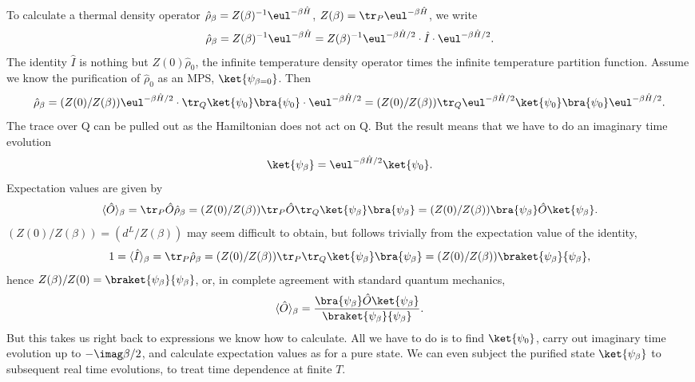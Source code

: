 To calculate a thermal density operator $\hat{\rho}_\beta= Z(\beta)^{-1} \eul^{-\beta \hat{H}}$, $Z(\beta) = \tr_P \eul^{-\beta \hat{H}}$, we write
\begin{equation}
\hat{\rho}_\beta = Z(\beta)^{-1} \eul^{-\beta \hat{H}} = Z(\beta)^{-1} \eul^{-\beta \hat{H}/2} \cdot \hat{I} \cdot \eul^{-\beta \hat{H}/2} .
\end{equation}
The identity $\hat{I}$ is nothing but $Z(0) \hat{\rho}_0$, the infinite temperature density operator times the infinite temperature partition function. Assume we know the purification of $\hat{\rho}_0$ as an MPS, $\ket{\psi_{\beta=0}}$. Then
\begin{equation}
\hat{\rho}_\beta = (Z(0)/Z(\beta)) \eul^{-\beta \hat{H}/2} \cdot \tr_Q \ket{\psi_0}\bra{\psi_0} \cdot \eul^{-\beta \hat{H}/2} = (Z(0)/Z(\beta)) \tr_Q \eul^{-\beta \hat{H}/2}\ket{\psi_0} \bra{\psi_0}\eul^{-\beta \hat{H}/2} .
\end{equation}
The trace over Q can be pulled out as the Hamiltonian does not act on Q. But the result means that we have to do an imaginary time evolution
\begin{equation}
\ket{\psi_\beta} = \eul^{-\beta \hat{H}/2}\ket{\psi_0} .
\end{equation}
Expectation values are given by 
\begin{equation}
\langle \hat{O} \rangle_\beta = \tr_P \hat{O}\hat{\rho}_\beta =
(Z(0)/Z(\beta)) \tr_P \hat{O} \tr_Q \ket{\psi_\beta} \bra{\psi_\beta}
= (Z(0)/Z(\beta)) \bra{\psi_\beta} \hat{O} \ket{\psi_\beta} .
\end{equation} 
$(Z(0)/Z(\beta)) = (d^L/Z(\beta))$ may seem difficult to obtain, but follows trivially from the expectation value of the identity, 
\begin{equation}
1 = \langle \hat{I} \rangle_\beta = \tr_P \hat{\rho}_\beta =
(Z(0)/Z(\beta)) \tr_P \tr_Q \ket{\psi_\beta} \bra{\psi_\beta}
= (Z(0)/Z(\beta)) \braket{\psi_\beta}{\psi_\beta} ,
\end{equation} 
hence $Z(\beta)/Z(0)= \braket{\psi_\beta}{\psi_\beta}$, or, in complete agreement with standard quantum mechanics,
\begin{equation}
\langle \hat{O} \rangle_\beta = \frac{ \bra{\psi_\beta} \hat{O}\ket{\psi_\beta}}{\braket{\psi_\beta}{\psi_\beta}} .
\end{equation}
But this takes us right back to expressions we know how to calculate. All we have to do is to find $\ket{\psi_0}$, carry out imaginary time evolution up to $-\imag\beta/2$, and calculate expectation values as for a pure state. We can even subject the purified state $\ket{\psi_\beta}$ to subsequent real time evolutions, to treat time dependence at finite $T$.

